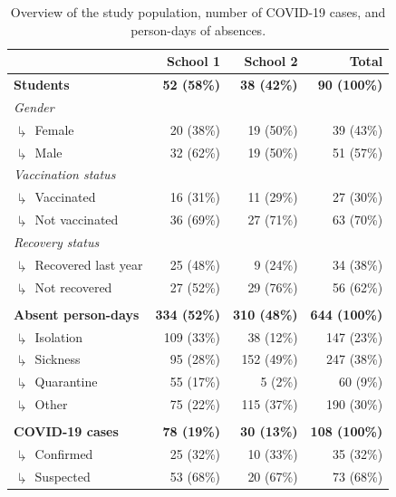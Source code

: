 \documentclass[fleqn,11pt]{wlscirep}
\begin{document}
\begin{table}[!htpb]
    \centering
    \caption{Overview of the study population, number of COVID-19 cases, and person-days of absences.}
    \label{tab:cases-overview-school}
    \footnotesize
    \begin{tabular}{l r r r}
    \toprule
         &  School 1 & School 2 & Total \\ \midrule 
        \textbf{Students} & \textbf{52 (58\%)} & \textbf{38 (42\%)} & \textbf{90 (100\%)} \\
        \emph{Gender} \\
        $\drsh$ Female & 20 (38\%) & 19 (50\%) & 39 (\hphantom{0}43\%) \\
        $\drsh$ Male & 32 (62\%) & 19 (50\%) & 51 (\hphantom{0}57\%) \\
        \emph{Vaccination status} \\
        $\drsh$ Vaccinated & 16 (31\%) & 11 (29\%) & 27 (\hphantom{0}30\%) \\
        $\drsh$ Not vaccinated & 36 (69\%) & 27 (71\%) & 63 (\hphantom{0}70\%) \\
        \emph{Recovery status} \\
        $\drsh$ Recovered last year & 25 (48\%) & 9 (24\%) & 34 (\hphantom{0}38\%) \\
        $\drsh$ Not recovered & 27 (52\%) & 29 (76\%) & 56 (\hphantom{0}62\%) \\
        & \\
        \textbf{Absent person-days} & \textbf{334 (52\%)} & \textbf{310 (48\%)} & \textbf{644 (100\%)} \\
        $\drsh$ Isolation & 109 (33\%) & 38 (12\%) & 147 (\hphantom{0}23\%) \\
        $\drsh$ Sickness & 95 (28\%) & 152 (49\%) & 247 (\hphantom{0}38\%) \\
        $\drsh$ Quarantine & 55 (17\%) & 5 (\hphantom{0}2\%) & 60 (\hphantom{00}9\%) \\
        $\drsh$ Other & 75 (22\%) & 115 (37\%) & 190 (\hphantom{0}30\%) \\
        & \\
        \textbf{COVID-19 cases} & \textbf{78 (19\%)} & \textbf{30 (13\%)} &  \textbf{108 (100\%)} \\
        $\drsh$ Confirmed & 25 (32\%) & 10 (\hphantom{0}33\%) & 35 (\hphantom{0}32\%) \\
        $\drsh$ Suspected & 53 (68\%) & 20 (\hphantom{0}67\%) & 73 (\hphantom{0}68\%) \\
        \bottomrule
    \end{tabular} 
\end{table}
\end{document}
